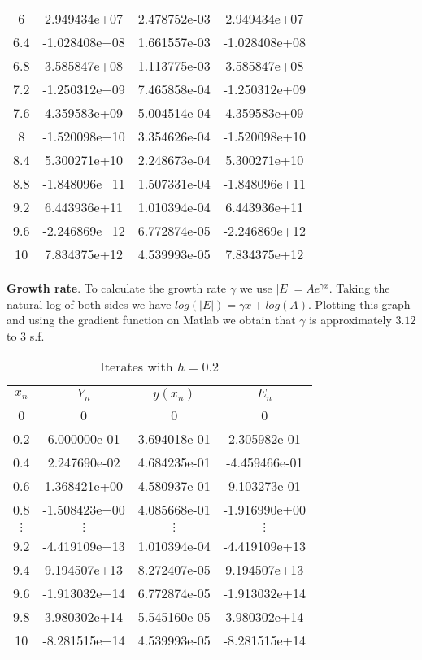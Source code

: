 \documentclass[14pt]{extarticle}
\begin{document}
\begin{table}[h!]
\begin{tabular}{cccc}
  6  &    2.949434e+07 &    2.478752e-03 &    2.949434e+07 \\ 
6.4  &   -1.028408e+08 &    1.661557e-03 &   -1.028408e+08 \\ 
6.8  &    3.585847e+08 &    1.113775e-03 &    3.585847e+08 \\ 
7.2  &   -1.250312e+09 &    7.465858e-04 &   -1.250312e+09 \\ 
7.6  &    4.359583e+09 &    5.004514e-04 &    4.359583e+09 \\ 
  8  &   -1.520098e+10 &    3.354626e-04 &   -1.520098e+10 \\ 
8.4  &    5.300271e+10 &    2.248673e-04 &    5.300271e+10 \\ 
8.8  &   -1.848096e+11 &    1.507331e-04 &   -1.848096e+11 \\ 
9.2  &    6.443936e+11 &    1.010394e-04 &    6.443936e+11 \\ 
9.6  &   -2.246869e+12 &    6.772874e-05 &   -2.246869e+12 \\ 
 10  &    7.834375e+12 &    4.539993e-05 &    7.834375e+12 \\ 
\end{tabular}
\label{table:1}
\end{table}

\noindent \textbf{Growth rate}. To calculate the growth rate $\gamma$ we use $|E| = Ae^{{\gamma}x}$. Taking the natural log of both sides we have $log(|E|) = {\gamma}x + log(A)$. Plotting this graph and using the gradient function on Matlab we obtain that $\gamma$ is approximately $3.12$ to $3$ s.f. 

\pagebreak

\begin{table}[h!]
\caption{Iterates with $h=0.2$}
\centering
\begin{tabular}{cccc}
\\
\textbf{$x_n$} & \textbf{$Y_n$} & $y(x_n)$ & $E_n$ \\ [0.5ex]
0    &    0            &    0            &    0            \\ 
0.2  &    6.000000e-01 &    3.694018e-01 &    2.305982e-01 \\ 
0.4  &    2.247690e-02 &    4.684235e-01 &   -4.459466e-01 \\ 
0.6  &    1.368421e+00 &    4.580937e-01 &    9.103273e-01 \\ 
0.8  &   -1.508423e+00 &    4.085668e-01 &   -1.916990e+00 \\ 
$\vdots$ & $\vdots$ & $\vdots$ & $\vdots$ \\
9.2  &   -4.419109e+13 &    1.010394e-04 &   -4.419109e+13 \\ 
9.4  &    9.194507e+13 &    8.272407e-05 &    9.194507e+13 \\ 
9.6  &   -1.913032e+14 &    6.772874e-05 &   -1.913032e+14 \\ 
9.8  &    3.980302e+14 &    5.545160e-05 &    3.980302e+14 \\ 
 10  &   -8.281515e+14 &    4.539993e-05 &   -8.281515e+14 \\ 
\end{tabular}
\label{table:2}
\end{table}
\end{document}
